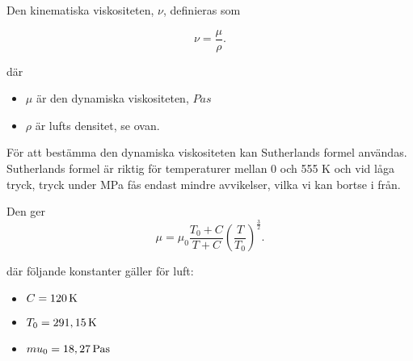 Den kinematiska viskositeten, $\nu$, definieras som \cite{kinematiskviskositet}

\begin{equation}
\nu = \frac {\mu} {\rho}.
\end{equation}

där 
\begin{itemize}
\item[] $\mu$ är den dynamiska viskositeten, $\unit{Pa s}$
\item[] $\rho$ är lufts densitet, se ovan.\\
\end{itemize}

För att bestämma den dynamiska viskositeten kan Sutherlands formel användas. Sutherlands formel är riktig för temperaturer mellan 0 och 555 K och vid låga tryck, tryck under \unit[3,45]{MPa} fås endast mindre avvikelser, vilka vi kan bortse i från.\cite{sutherlandsformula}

Den ger  
\begin{equation}
{\mu} = {\mu}_0 \frac {T_0+C} {T + C} \left (\frac {T} {T_0} \right )^{\frac{3}{2}}.
\end{equation}

där följande konstanter gäller för luft:
\begin{itemize}
\item[] $C=\unit[120]{K}$
\item[] $T_0=\unit[291,15]{K}$
\item[] $mu_0=\unit[18,27]{Pa s}$
\end{itemize}



